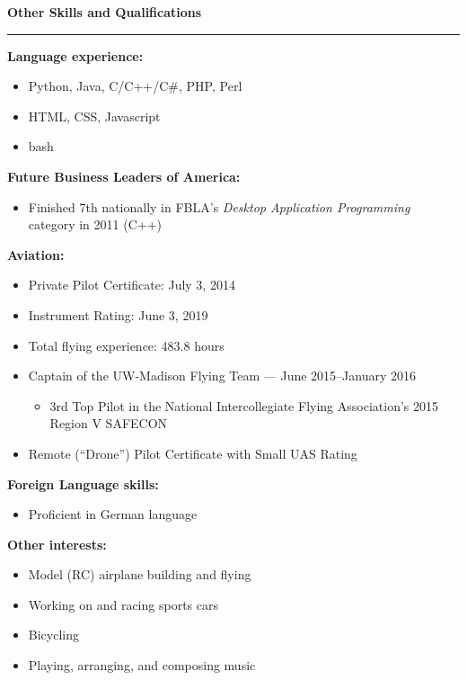 \documentclass[12pt,letterpaper]{article}
\newenvironment{details}{
    \vspace{-.8em}
    \begin{itemize}
        \renewcommand \labelitemi{\labelitemiv}
        \setlength{\itemsep}{0pt}
        \setlength{\parskip}{-1pt}
        \setlength{\parsep}{0pt}
    }{
    \end{itemize}
    \vspace{-.5em}
}
\newcommand{\hr} {
    \vspace{-1em}
    \par\rule{\textwidth}{1pt}
    \vspace{-1.5em}
}
\newcommand{\ressection}[1] {
    \par{\large \textbf{#1}}
    \hr
}
\newenvironment{other} {
    \ressection{Other Skills and Qualifications}
    \setlength{\parskip}{3pt}
}{
    \vspace{0.5em}
}
\begin{document}
\begin{other}
\par \textbf{Language experience:}
\vspace{1pt}
\begin{details}
    \item Python, Java, C/C++/C\#, PHP, Perl
    \item HTML, CSS, Javascript
    \item bash
\end{details}
\par \textbf{Future Business Leaders of America:}
\vspace{1pt}
\begin{details}
    \item Finished 7th nationally in FBLA's \textit{Desktop Application Programming} category in 2011 (C++)
\end{details}

\par \textbf{Aviation:}
\vspace{1pt}
\begin{details}
    \item Private Pilot Certificate: July 3, 2014
    \item Instrument Rating: June 3, 2019
    \item Total flying experience: 483.8 hours
    \item Captain of the UW-Madison Flying Team --- June 2015--January 2016
    \vspace{.5em}
    \begin{details}
        \item 3rd Top Pilot in the National Intercollegiate Flying Association's 2015 Region V SAFECON
    \end{details}
    \item Remote (``Drone'') Pilot Certificate with Small UAS Rating
\end{details}

\par \textbf{Foreign Language skills:}
\vspace{1pt}
\begin{details}
    \item Proficient in German language
\end{details}

\par \textbf{Other interests:}
\vspace{1pt}
\begin{details}
    \item Model (RC) airplane building and flying
    \item Working on and racing sports cars
    \item Bicycling
    \item Playing, arranging, and composing music
\end{details}

\end{other}
\end{document}
